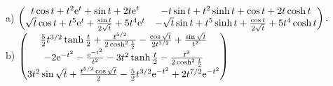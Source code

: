 {
{ a)} $\begin{pmatrix}
t\cos t + t^2 \mathrm{e}^{t}+\sin t + 2t\mathrm{e}^{t} & -t\sin t + t^2 \sinh t + \cos t + 2t\cosh t\\
\sqrt t \cos t + t^5\mathrm{e}^{t} + \frac {\sin t}{2\sqrt t } + 5t^4\mathrm{e}^{t}&
-\sqrt t \sin t + t^5\sinh t + \frac{\cos t}{2\sqrt t}  + 5 t^4\cosh t\end{pmatrix}.$\\
{ b)} $\begin{pmatrix} \frac 52 t^{3/2}\tanh \frac t2 + \frac{t^{5/2}}{2\cosh^2 \frac t2} - \frac{\cos \sqrt
t}{2t^{3/2}}+\frac{\sin\sqrt t}{t^2}\\
-2\mathrm{e}^{-t^2}-\frac{\mathrm{e}^{-t^2}}{t^2}-3t^2\tanh\frac t2-\frac{t^3}{2\cosh^2 \frac t2}\\
 3t^2\sin\sqrt t +\frac{t^{5/2}\cos\sqrt t}{2} - \frac 52 t^{3/2}\mathrm{e}^{-t^2}+2t^{7/2}\mathrm{e}^{-t^2}
\end{pmatrix}$

}
